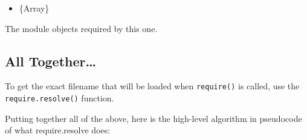 \begin{itemize}
\itemsep1pt\parskip0pt
\item
  \{Array\}
\end{itemize}

The module objects required by this one.

\subsection{All Together\ldots{}}\label{all-together}

To get the exact filename that will be loaded when \texttt{require()} is
called, use the \texttt{require.resolve()} function.

Putting together all of the above, here is the high-level algorithm in
pseudocode of what require.resolve does:


